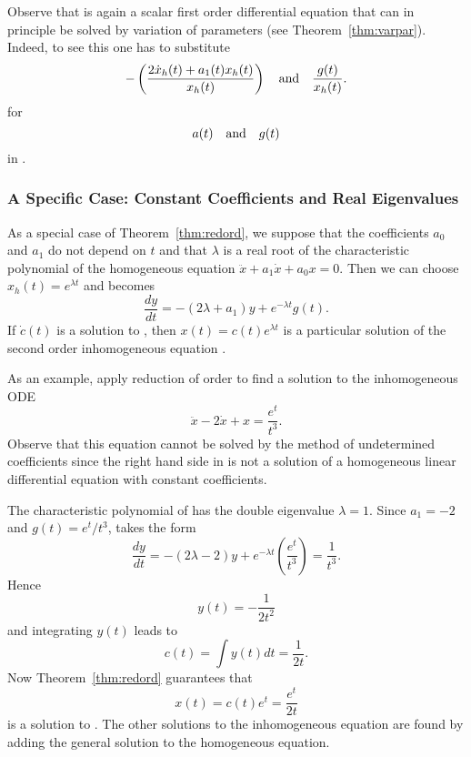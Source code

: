 \documentclass{ximera}
\begin{document}
Observe that  is again a scalar first order differential
equation that can in principle be solved by variation of 
parameters (see Theorem~\ref{thm:varpar}).
Indeed, to see this one has to substitute
\[
 -\left(\frac{2\dot x_h(t)+a_1(t) x_h(t)}{x_h(t)}\right)
\quad\mbox{and}\quad \frac{g(t)}{x_h(t)}.
\]
for
\[
a(t) \quad\mbox{and}\quad g(t)
\]
in .




\subsubsection*{A Specific Case: Constant Coefficients and Real Eigenvalues}

As a special case of Theorem~\ref{thm:redord}, we suppose that 
the coefficients $a_0$ and $a_1$ do not depend on $t$ and that $\lambda$ is a
real root of the characteristic 
polynomial 
of the homogeneous equation
$\ddot{x} + a_1\dot{x} + a_0x = 0$.  Then we can choose $x_h(t)=e^{\lambda t}$
and  becomes
\begin{equation}  \label{eq:redeqreal}
\frac{dy}{dt} = -(2\lambda +a_1) y + e^{-\lambda t}g(t).
\end{equation}
If $\dot c(t)$ is a solution to , then
$x(t)=c(t) e^{\lambda t}$ is a particular 
solution 
of the second order inhomogeneous equation .

As an example, apply reduction of order to find a solution to the inhomogeneous
ODE
\begin{equation}  \label{e:inhomex1}
\ddot{x} - 2\dot{x} + x = \frac{e^t}{t^3}.
\end{equation}
Observe that this equation cannot be solved by the method of undetermined
coefficients since the right hand 
side in  is not a
solution of a homogeneous linear differential equation with constant 
coefficients.

The characteristic polynomial of  has the double eigenvalue 
$\lambda = 1$.  Since $a_1=-2$ and $g(t) = e^t/t^3$,  takes 
the form
\[
\frac{dy}{dt} = -(2\lambda -2) y + e^{-\lambda t}\left( \frac{e^t}{t^3}\right)
= \frac{1}{t^3}.
\]
Hence 
\[
y(t) = -\frac{1}{2t^2}
\]
and integrating $y(t)$ leads to
\[
c(t) = \int y(t) dt = \frac{1}{2t}.
\]
Now Theorem~\ref{thm:redord} guarantees that
\[
x(t) = c(t)e^t = \frac{e^t}{2t}
\]
is a solution to .  The other solutions to the inhomogeneous
equation are found by adding the general solution 
to the homogeneous equation.
\end{document}
